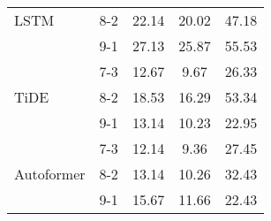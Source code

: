 \begin{table}[h!]
\begin{tabular}{|l|c|c|c|c|}
    \rowcolor{white} LSTM & 8-2 & 22.14 & 20.02 & 47.18 \\ 
    \rowcolor{white}  & 9-1 & 27.13 & 25.87 & 55.53 \\ \hline
    \rowcolor{white} & 7-3 & 12.67 & 9.67 & 26.33 \\ 
    \rowcolor{white} TiDE & 8-2 & 18.53 & 16.29 & 53.34 \\ 
    \rowcolor{white} & 9-1 & 13.14 & 10.23 & 22.95 \\ \hline
    \rowcolor{white}  & 7-3 & 12.14 & 9.36 & 27.45 \\ 
    \rowcolor{white}  Autoformer & 8-2 & 13.14 & 10.26 & 32.43 \\ 
    \rowcolor{white}  & 9-1 & 15.67 & 11.66 & 22.43 \\ \hline

    \end{tabular}
\end{table}